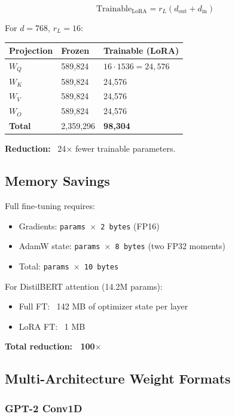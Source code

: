 \[
\text{Trainable}_\text{LoRA} = r_L (d_\text{out} + d_\text{in})
\tag{3.6}
\]

For $d = 768$, $r_L = 16$:

\begin{table}[H]
\centering
\small
\begin{tabular}{lll}
\toprule
\textbf{Projection} & \textbf{Frozen} & \textbf{Trainable (LoRA)} \\
\midrule
$W_Q$ & 589,824 & $16 \cdot 1536 = 24,576$ \\
$W_K$ & 589,824 & 24,576 \\
$W_V$ & 589,824 & 24,576 \\
$W_O$ & 589,824 & 24,576 \\
\textbf{Total} & 2,359,296 & \textbf{98,304} \\
\bottomrule
\end{tabular}
\end{table}

\textbf{Reduction:} ~24$\times$ fewer trainable parameters.

\subsection{Memory Savings}

Full fine-tuning requires:
\begin{itemize}
\item Gradients: \texttt{params $\times$ 2 bytes} (FP16)
\item AdamW state: \texttt{params $\times$ 8 bytes} (two FP32 moments)
\item Total: \texttt{params $\times$ 10 bytes}

\end{itemize}
For DistilBERT attention (14.2M params):
\begin{itemize}
\item Full FT: ~142 MB of optimizer state per layer
\item LoRA FT: ~1 MB

\end{itemize}
\textbf{Total reduction: ~100$\times$}

\subsection{Multi-Architecture Weight Formats}

\subsubsection{GPT-2 Conv1D}

